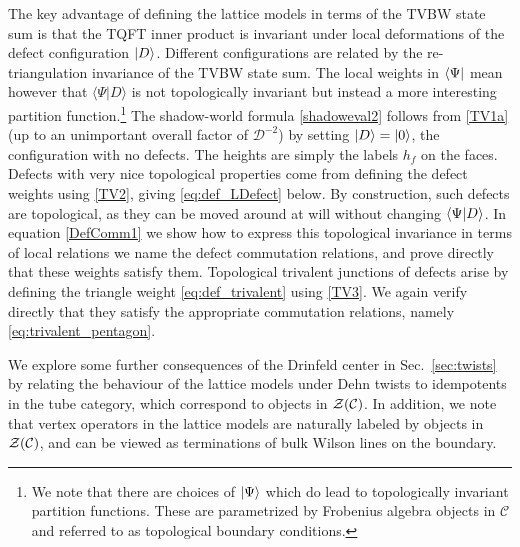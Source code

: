 The key advantage of defining the lattice models in terms of the TVBW state sum  is that the TQFT inner product is invariant under local deformations of the defect configuration $\ket{D}$. 
Different configurations are related by the re-triangulation invariance of the TVBW state sum. 
The local weights in $\bra{\Psi}$ mean however that $\langle \Psi |D \rangle$ is not topologically invariant but instead a more interesting partition function.\footnote{We note that there are choices of $\ket{\Psi}$ which do lead to topologically invariant partition functions. 
These are parametrized by Frobenius algebra objects in $\mathcal{C}$ and referred to as topological boundary conditions.} The shadow-world formula \eqref{shadoweval2} follows from  \eqref{TV1a} (up to an unimportant overall factor of $\mathscr{D}^{-2}$) by setting $\ket{D}=\ket{0}$, the configuration with no defects. The heights are simply the labels $h_f$ on the faces.  Defects with very nice topological properties come from defining the defect weights using \eqref{TV2}, giving \eqref{eq:def_LDefect} below. By construction, such defects are topological, as they can be moved around at will without changing $\braket{ \Psi | D }$.  In equation \eqref{DefComm1} we show how to express this topological invariance in terms of local relations we name the defect commutation relations, and prove  directly that these weights satisfy them. Topological trivalent junctions of defects arise by defining the triangle weight \eqref{eq:def_trivalent}	using \eqref{TV3}. We again verify directly that they satisfy the appropriate commutation relations, namely \eqref{eq:trivalent_pentagon}.

We explore some further consequences of the Drinfeld center in Sec.~\ref{sec:twists} by relating the behaviour of the lattice models under Dehn twists to idempotents in the tube category, which correspond to objects in $\mathcal{Z}(\mathcal{C})$. In addition, we note that vertex operators in the lattice models are naturally labeled by objects in $\mathcal{Z}(\mathcal{C})$, and can be viewed as terminations of bulk Wilson lines on the boundary. 
